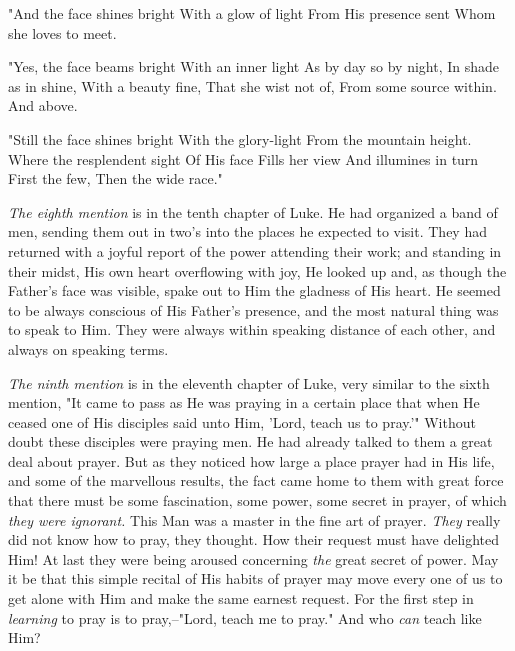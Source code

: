     "And the face shines bright
    With a glow of light
    From His presence sent
    Whom she loves to meet.

    "Yes, the face beams bright
    With an inner light
    As by day so by night,
    In shade as in shine,
    With a beauty fine,
    That she wist not of,
    From some source within.
       And above.

    "Still the face shines bright
    With the glory-light
    From the mountain height.
    Where the resplendent sight
    Of His face
    Fills her view
    And illumines in turn
    First the few,
    Then the wide race."

\textit{The eighth mention} is in the tenth chapter of Luke. He had organized a
band of men, sending them out in two's into the places he expected to
visit. They had returned with a joyful report of the power attending their
work; and standing in their midst, His own heart overflowing with joy, He
looked up and, as though the Father's face was visible, spake out to Him
the gladness of His heart. He seemed to be always conscious of His
Father's presence, and the most natural thing was to speak to Him. They
were always within speaking distance of each other, and always on speaking
terms.

\textit{The ninth mention} is in the eleventh chapter of Luke, very similar to
the sixth mention, "It came to pass as He was praying in a certain place
that when He ceased one of His disciples said unto Him, 'Lord, teach us
to pray.'" Without doubt these disciples were praying men. He had already
talked to them a great deal about prayer. But as they noticed how large a
place prayer had in His life, and some of the marvellous results, the fact
came home to them with great force that there must be some fascination,
some power, some secret in prayer, of which \textit{they were ignorant.} This Man
was a master in the fine art of prayer. \textit{They} really did not know how to
pray, they thought. How their request must have delighted Him! At last
they were being aroused concerning \textit{the} great secret of power. May it be
that this simple recital of His habits of prayer may move every one of us
to get alone with Him and make the same earnest request. For the first
step in \textit{learning} to pray is to pray,--"Lord, teach me to pray." And who
\textit{can} teach like Him?

